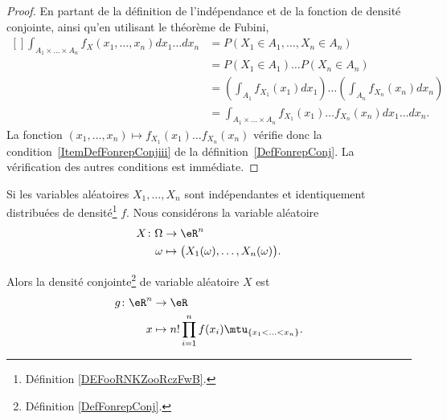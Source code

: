 \begin{proof}
	En partant de la définition de l'indépendance et de la fonction de densité conjointe, ainsi qu'en utilisant le théorème de Fubini,
	\begin{equation}
		\begin{aligned}[]
			\int_{A_1\times \ldots\times A_n}f_X(x_1,\ldots,x_n)dx_1\ldots dx_n & =
			P(X_1\in A_1,\ldots,X_n\in A_n)                                                                                                                                 \\
			                                                                    & =P(X_1\in A_1)\ldots P(X_n\in A_n)                                                        \\
			                                                                    & =\left( \int_{A_1}f_{X_1}(x_1)dx_1 \right)\ldots\left( \int_{A_n}f_{X_n}(x_n)dx_n \right) \\
			                                                                    & =\int_{A_1\times\ldots\times A_n}f_{X_1}(x_1)\ldots f_{X_n}(x_n)dx_1\ldots dx_n.
		\end{aligned}
	\end{equation}
	La fonction \( (x_1,\ldots,x_n)\mapsto f_{X_1}(x_1)\ldots f_{X_n}(x_n)\) vérifie donc la condition~\ref{ItemDefFonrepConjiii} de la définition~\ref{DefFonrepConj}. La vérification des autres conditions est immédiate.
\end{proof}


\begin{lemma}     \label{LEMooLNIZooDWUvRN}
	Si les variables aléatoires \( X_1,\ldots, X_n\) sont indépendantes et identiquement distribuées de densité\footnote{Définition \ref{DEFooRNKZooRczFwB}.} \( f\). Nous considérons la variable aléatoire
	\begin{equation}
		\begin{aligned}
			X\colon \Omega & \to \eR^n                                           \\
			\omega         & \mapsto \big( X_1(\omega),\ldots,X_n(\omega) \big).
		\end{aligned}
	\end{equation}

	Alors la densité conjointe\footnote{Définition \ref{DefFonrepConj}.} de variable aléatoire \( X\) est
	\begin{equation}
		\begin{aligned}
			g\colon \eR^n & \to \eR                                                      \\
			x             & \mapsto    n!\prod_{i=1}^nf(x_i)\mtu_{\{ x_1<\ldots<x_n \}}.
		\end{aligned}
	\end{equation}
\end{lemma}

